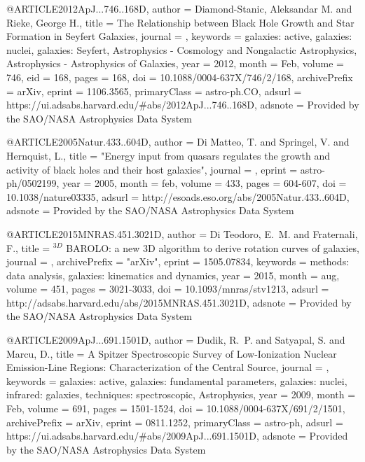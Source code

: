 \documentclass[longauth]{aa}
\begin{document}
@ARTICLE{2012ApJ...746..168D,
       author = {{Diamond-Stanic}, Aleksandar M. and {Rieke}, George H.},
        title = {The Relationship between Black Hole Growth and Star Formation in Seyfert Galaxies},
      journal = {\apj},
     keywords = {galaxies: active, galaxies: nuclei, galaxies: Seyfert, Astrophysics - Cosmology and Nongalactic Astrophysics, Astrophysics - Astrophysics of Galaxies},
         year = 2012,
        month = Feb,
       volume = {746},
          eid = {168},
        pages = {168},
          doi = {10.1088/0004-637X/746/2/168},
archivePrefix = {arXiv},
       eprint = {1106.3565},
 primaryClass = {astro-ph.CO},
       adsurl = {https://ui.adsabs.harvard.edu/#abs/2012ApJ...746..168D},
      adsnote = {Provided by the SAO/NASA Astrophysics Data System}
}

@ARTICLE{2005Natur.433..604D,
   author = {{Di Matteo}, T. and {Springel}, V. and {Hernquist}, L.},
    title = "{Energy input from quasars regulates the growth and activity of black holes and their host galaxies}",
  journal = {\nat},
   eprint = {astro-ph/0502199},
     year = 2005,
    month = feb,
   volume = 433,
    pages = {604-607},
      doi = {10.1038/nature03335},
   adsurl = {http://esoads.eso.org/abs/2005Natur.433..604D},
  adsnote = {Provided by the SAO/NASA Astrophysics Data System}
}

@ARTICLE{2015MNRAS.451.3021D,
   author = {{Di Teodoro}, E.~M. and {Fraternali}, F.},
    title = {$^{3D}$ BAROLO: a new 3D algorithm to derive rotation curves of galaxies},
  journal = {\mnras},
archivePrefix = "arXiv",
   eprint = {1505.07834},
 keywords = {methods: data analysis, galaxies: kinematics and dynamics},
     year = 2015,
    month = aug,
   volume = 451,
    pages = {3021-3033},
      doi = {10.1093/mnras/stv1213},
   adsurl = {http://adsabs.harvard.edu/abs/2015MNRAS.451.3021D},
  adsnote = {Provided by the SAO/NASA Astrophysics Data System}
}

@ARTICLE{2009ApJ...691.1501D,
       author = {{Dudik}, R.~P. and {Satyapal}, S. and {Marcu}, D.},
        title = {A Spitzer Spectroscopic Survey of Low-Ionization Nuclear Emission-Line Regions: Characterization of the Central Source},
      journal = {\apj},
     keywords = {galaxies: active, galaxies: fundamental parameters, galaxies: nuclei, infrared: galaxies, techniques: spectroscopic, Astrophysics},
         year = 2009,
        month = Feb,
       volume = {691},
        pages = {1501-1524},
          doi = {10.1088/0004-637X/691/2/1501},
archivePrefix = {arXiv},
       eprint = {0811.1252},
 primaryClass = {astro-ph},
       adsurl = {https://ui.adsabs.harvard.edu/#abs/2009ApJ...691.1501D},
      adsnote = {Provided by the SAO/NASA Astrophysics Data System}
}
\end{document}
